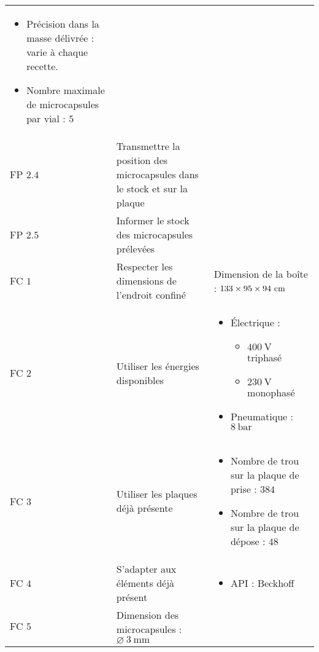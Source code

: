 \begin{longtable}{l|m{5cm}|m{5cm}}
\begin{itemize}
            \item Précision dans la masse délivrée : varie à chaque recette.
            \item Nombre maximale de microcapsules par vial : $5$
        \end{itemize}\\
        FP $2.4$&\centering Transmettre la position des microcapsules dans le stock et sur la plaque&\\
        FP $2.5$&\centering Informer le stock des microcapsules prélevées&\\
        FC $1$&\centering Respecter les dimensions de l'endroit confiné &Dimension de la boîte  : $\numproduct{133 x 95 x 94}~\unit{\cm}$\\
        FC $2$&\centering Utiliser les énergies disponibles& \begin{itemize}
            \item Électrique : \begin{itemize}
                \item $\qty{400}{\volt}$ triphasé
                \item $\qty{230}{\volt}$ monophasé
            \end{itemize}
            \item Pneumatique : $\qty{8}{\bar}$
        \end{itemize}\\ 
        FC $3$&\centering Utiliser les plaques déjà présente&\begin{itemize}
            \item Nombre de trou sur la plaque de prise : $384$
            \item Nombre de trou sur la plaque de dépose : $48$
        \end{itemize}\\
        FC $4$&\centering S'adapter aux éléments déjà présent&\begin{itemize}
            \item API : Beckhoff
        \end{itemize}\\
        FC $5$&\centering Dimension des microcapsules : $\varnothing~\qty{3}{\mm}$&

    \end{longtable}